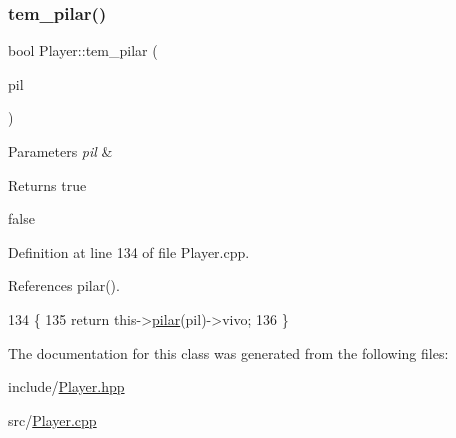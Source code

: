 \subsubsection{\texorpdfstring{tem\+\_\+pilar()}{tem\_pilar()}}
{\footnotesize\ttfamily bool Player\+::tem\+\_\+pilar (\begin{DoxyParamCaption}\item[{Tipo\+Pilar}]{pil }\end{DoxyParamCaption})}


\begin{DoxyParams}{Parameters}
{\em pil} & \\
\hline
\end{DoxyParams}
\begin{DoxyReturn}{Returns}
true 

false 
\end{DoxyReturn}


Definition at line 134 of file Player.\+cpp.



References pilar().


\begin{DoxyCode}
134                                     \{
135     \textcolor{keywordflow}{return} this->\mbox{\hyperlink{class_player_aa953125244cebb04b2363ae102c5fbf6}{pilar}}(pil)->vivo;
136 \}
\end{DoxyCode}


The documentation for this class was generated from the following files\+:\begin{DoxyCompactItemize}
\item 
include/\mbox{\hyperlink{_player_8hpp}{Player.\+hpp}}\item 
src/\mbox{\hyperlink{_player_8cpp}{Player.\+cpp}}\end{DoxyCompactItemize}
